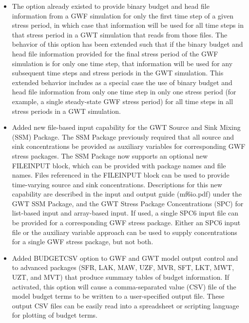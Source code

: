 \begin{itemize}
	        \item The option already existed to provide binary budget and head file information from a GWF simulation for only the first time step of a given stress period, in which case that information will be used for all time steps in that stress period in a GWT simulation that reads from those files. The behavior of this option has been extended such that if the binary budget and head file information provided for the final stress period of the GWF simulation is for only one time step, that information will be used for any subsequent time steps and stress periods in the GWT simulation. This extended behavior includes as a special case the use of binary budget and head file information from only one time step in only one stress period (for example, a single steady-state GWF stress period) for all time steps in all stress periods in a GWT simulation.
	        \item Added new file-based input capability for the GWT Source and Sink Mixing (SSM) Package.  The SSM Package previously required that all source and sink concentrations be provided as auxiliary variables for corresponding GWF stress packages.  The SSM Package now supports an optional new FILEINPUT block, which can be provided with package names and file names.  Files referenced in the FILEINPUT block can be used to provide time-varying source and sink concentrations.  Descriptions for this new capability are described in the input and output guide (mf6io.pdf) under the GWT SSM Package, and the GWT Stress Package Concentrations (SPC) for list-based input and array-based input.  If used, a single SPC6 input file can be provided for a corresponding GWF stress package.  Either an SPC6 input file or the auxiliary variable approach can be used to supply concentrations for a single GWF stress package, but not both.
	        \item Added BUDGETCSV option to GWF and GWT model output control and to advanced packages (SFR, LAK, MAW, UZF,  MVR, SFT, LKT, MWT, UZT, and MVT) that produce summary tables of budget information.  If activated, this option will cause a comma-separated value (CSV) file of the model budget terms to be written to a user-specified output file.  These output CSV files can be easily read into a spreadsheet or scripting language for plotting of budget terms.

\end{itemize}
